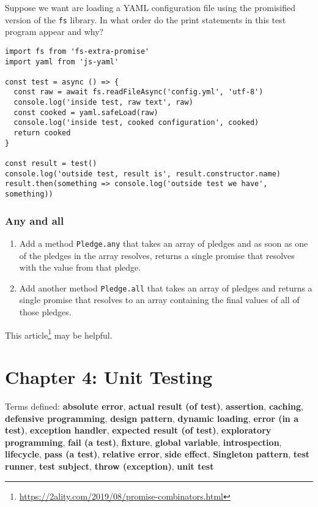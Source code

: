 \documentclass[krantzl]{krantz}
\newcommand{\glossref}[1]{\textbf{#1}}
\newcommand{\hreffoot}[2]{{#1}\footnote{\href{#2}{#2}}}
\begin{document}
Suppose we want are loading a YAML configuration file
using the promisified version of the \texttt{fs} library.
In what order do the print statements in this test program appear and why?


\begin{lstlisting}[frame=single,frameround=tttt]
import fs from 'fs-extra-promise'
import yaml from 'js-yaml'

const test = async () => {
  const raw = await fs.readFileAsync('config.yml', 'utf-8')
  console.log('inside test, raw text', raw)
  const cooked = yaml.safeLoad(raw)
  console.log('inside test, cooked configuration', cooked)
  return cooked
}

const result = test()
console.log('outside test, result is', result.constructor.name)
result.then(something => console.log('outside test we have', something))
\end{lstlisting}


\subsection*{Any and all}

\begin{enumerate}

\item 

Add a method \texttt{Pledge.any} that takes an array of pledges
    and as soon as one of the pledges in the array resolves,
    returns a single promise that resolves with the value from that pledge.



\item 

Add another method \texttt{Pledge.all} that takes an array of pledges
    and returns a single promise that resolves to an array
    containing the final values of all of those pledges.



\end{enumerate}


\hreffoot{This article}{https://2ality.com/2019/08/promise-combinators.html} may be helpful.

\chapter{Chapter 4: Unit Testing}\label{unit-test}


\noindent 
    Terms defined:
    \glossref{absolute error}, \glossref{actual result (of test)}, \glossref{assertion}, \glossref{caching}, \glossref{defensive programming}, \glossref{design pattern}, \glossref{dynamic loading}, \glossref{error (in a test)}, \glossref{exception handler}, \glossref{expected result (of test)}, \glossref{exploratory programming}, \glossref{fail (a test)}, \glossref{fixture}, \glossref{global variable}, \glossref{introspection}, \glossref{lifecycle}, \glossref{pass (a test)}, \glossref{relative error}, \glossref{side effect}, \glossref{Singleton pattern}, \glossref{test runner}, \glossref{test subject}, \glossref{throw (exception)}, \glossref{unit test}
\end{document}
